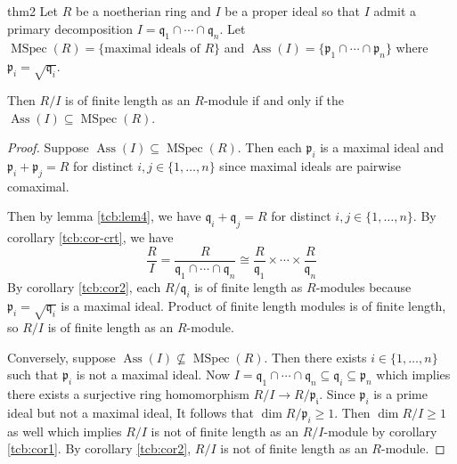 \documentclass[a4paper,10pt]{article}
\theoremstyle{definition}
\newcommand\lref[2][blue!60!black]{lemma \ref{tcb:#2}}
\newcommand\cref[2][blue!60!black]{corollary \ref{tcb:#2}}
\newcommand\Ass{\operatorname{Ass}}
\newcommand\MSpec{\operatorname{MSpec}}
\renewcommand\geq{\geqslant}
\begin{document}
\begin{theorem}{}{thm2}
Let $R$ be a noetherian ring and $I$ be a proper ideal
so that $I$ admit a primary decomposition 
$I=\mathfrak{q}_1\cap\cdots\cap\mathfrak{q}_n$.
Let $\MSpec(R)=\{\text{maximal ideals of }R\}$ and 
$\Ass(I)=\{\mathfrak{p}_1\cap\cdots\cap\mathfrak{p}_n\}$
where $\mathfrak{p}_i=\sqrt{\mathfrak{q}_i}$.

Then $R/I$ is of finite length as an $R$-module if and only if 
the $\Ass(I)\subseteq\MSpec(R)$.
\end{theorem}
\begin{proof}
Suppose $\Ass(I)\subseteq\MSpec(R)$.
Then each $\mathfrak{p}_i$ is a maximal ideal and 
$\mathfrak{p}_i+\mathfrak{p}_j=R$ for distinct $i,j\in\{1,\dots,n\}$
since maximal ideals are pairwise comaximal.

Then by \lref{lem4}, we have $\mathfrak{q}_i+\mathfrak{q}_j=R$ 
for distinct $i,j\in\{1,\dots,n\}$.
By \cref{cor-crt}, we have
\begin{equation*}
\frac{R}{I}=\frac{R}{\mathfrak{q}_1\cap\cdots\cap\mathfrak{q}_n}
\cong\frac{R}{\mathfrak{q}_1}\times\cdots\times\frac{R}{\mathfrak{q}_n}
\end{equation*}
By \cref{cor2}, each $R/\mathfrak{q}_i$ is of finite length as $R$-modules 
because $\mathfrak{p}_i=\sqrt{\mathfrak{q}_i}$ is a maximal ideal.
Product of finite length modules is of finite length,
so $R/I$ is of finite length as an $R$-module.

Conversely, suppose $\Ass(I)\not\subseteq\MSpec(R)$.
Then there exists $i\in\{1,\dots,n\}$ such that $\mathfrak{p}_i$ 
is not a maximal ideal.
Now $I=\mathfrak{q}_1\cap\cdots\cap\mathfrak{q}_n\subseteq
\mathfrak{q}_i\subseteq\mathfrak{p}_n$ which implies 
there exists a surjective ring homomorphism $R/I\to R/\mathfrak{p_i}$.
Since $\mathfrak{p}_i$ is a prime ideal but not a maximal ideal,
It follows that $\dim R/\mathfrak{p}_i\geq1$.
Then $\dim R/I\geq1$ as well which implies 
$R/I$ is not of finite length as an $R/I$-module by \cref{cor1}.
By \cref{cor2}, $R/I$ is not of finite length as an $R$-module.
\end{proof}

\pagebreak

\printindex
\hypertarget{index}{}
{}
\end{document}
